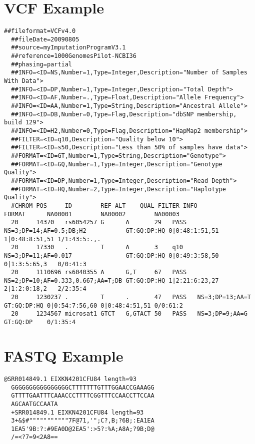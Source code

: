 \section{VCF Example}
\begin{lstlisting}[numbers=none, breaklines=true]
  ##fileformat=VCFv4.0
  ##fileDate=20090805
  ##source=myImputationProgramV3.1
  ##reference=1000GenomesPilot-NCBI36
  ##phasing=partial
  ##INFO=<ID=NS,Number=1,Type=Integer,Description="Number of Samples With Data">
  ##INFO=<ID=DP,Number=1,Type=Integer,Description="Total Depth">
  ##INFO=<ID=AF,Number=.,Type=Float,Description="Allele Frequency">
  ##INFO=<ID=AA,Number=1,Type=String,Description="Ancestral Allele">
  ##INFO=<ID=DB,Number=0,Type=Flag,Description="dbSNP membership, build 129">
  ##INFO=<ID=H2,Number=0,Type=Flag,Description="HapMap2 membership">
  ##FILTER=<ID=q10,Description="Quality below 10">
  ##FILTER=<ID=s50,Description="Less than 50% of samples have data">
  ##FORMAT=<ID=GT,Number=1,Type=String,Description="Genotype">
  ##FORMAT=<ID=GQ,Number=1,Type=Integer,Description="Genotype Quality">
  ##FORMAT=<ID=DP,Number=1,Type=Integer,Description="Read Depth">
  ##FORMAT=<ID=HQ,Number=2,Type=Integer,Description="Haplotype Quality">
  #CHROM POS     ID        REF ALT    QUAL FILTER INFO                              FORMAT      NA00001        NA00002        NA00003
  20     14370   rs6054257 G      A       29   PASS   NS=3;DP=14;AF=0.5;DB;H2           GT:GQ:DP:HQ 0|0:48:1:51,51 1|0:48:8:51,51 1/1:43:5:.,.
  20     17330   .         T      A       3    q10    NS=3;DP=11;AF=0.017               GT:GQ:DP:HQ 0|0:49:3:58,50 0|1:3:5:65,3   0/0:41:3
  20     1110696 rs6040355 A      G,T     67   PASS   NS=2;DP=10;AF=0.333,0.667;AA=T;DB GT:GQ:DP:HQ 1|2:21:6:23,27 2|1:2:0:18,2   2/2:35:4
  20     1230237 .         T      .       47   PASS   NS=3;DP=13;AA=T                   GT:GQ:DP:HQ 0|0:54:7:56,60 0|0:48:4:51,51 0/0:61:2
  20     1234567 microsat1 GTCT   G,GTACT 50   PASS   NS=3;DP=9;AA=G                    GT:GQ:DP    0/1:35:4 
\end{lstlisting}

\section{FASTQ Example}
\begin{lstlisting}[numbers=none, breaklines=true]
  @SRR014849.1 EIXKN4201CFU84 length=93
  GGGGGGGGGGGGGGGGCTTTTTTTGTTTGGAACCGAAAGG
  GTTTTGAATTTCAAACCCTTTTCGGTTTCCAACCTTCCAA
  AGCAATGCCAATA
  +SRR014849.1 EIXKN4201CFU84 length=93
  3+&$#"""""""""""7F@71,'";C?,B;?6B;:EA1EA
  1EA5'9B:?:#9EA0D@2EA5':>5?:%A;A8A;?9B;D@
  /=<?7=9<2A8==
\end{lstlisting}

